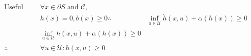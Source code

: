 \documentclass[preview]{standalone}
\begin{document}
\begin{align*}
\text{Useful property: } &\forall x \in \partial S \text{ and } \mathcal{C},\\ &h(x) = 0, b(x) \geq 0 \therefore &\inf_{u \in \mathcal{U}} \dot h(x, u) + \alpha(h(x)) \geq 0\\ & \inf_{u \in \mathcal{U}} \dot h(x, u) + \alpha(h(x)) \geq 0\\ \therefore & \forall u \in \mathcal{U}: \dot h(x, u) \geq 0
\end{align*}
\end{document}
